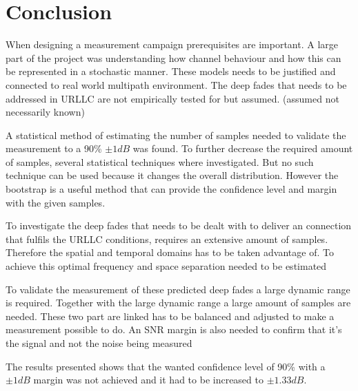 \chapter{Conclusion}

When designing a measurement campaign prerequisites are important. A large part of the project was understanding how channel behaviour and how this can be represented in a stochastic manner. These models needs to be justified and connected to real world multipath environment. The deep fades that needs to be addressed in \gls{URLLC} are not empirically tested for but assumed. (assumed not necessarily known)

A statistical method of estimating the number of samples needed to validate the measurement to a 90\% $\pm 1dB$ was found. To further decrease the required amount of samples, several statistical techniques where investigated. But no such technique can be used because it changes the overall distribution. However the bootstrap is a useful method that can provide the confidence level and margin with the given samples.

To investigate the deep fades that needs to be dealt with to deliver an connection that fulfils the \gls{URLLC} conditions, requires an extensive amount of samples. Therefore the spatial and temporal domains has to be taken advantage of. To achieve this optimal frequency and space separation needed to be estimated

To validate the measurement of these predicted deep fades a large dynamic range is required. Together with the large dynamic range a large amount of samples are needed. These two part are linked has to be balanced and adjusted to make a measurement possible to do. An SNR margin is also needed to confirm that it's the signal and not the noise being measured

The results presented shows that the wanted confidence level of 90\% with a $\pm 1dB$ margin was not achieved and it had to be increased to $\pm 1.33dB$.





